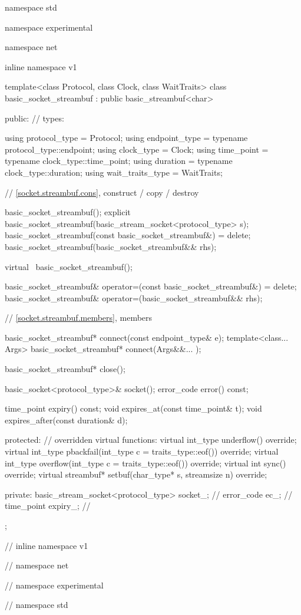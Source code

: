 \begin{codeblock}
namespace std {
namespace experimental {
namespace net {
inline namespace v1 {

  template<class Protocol, class Clock, class WaitTraits>
  class basic_socket_streambuf : public basic_streambuf<char>
  {
  public:
    // types:

    using protocol_type = Protocol;
    using endpoint_type = typename protocol_type::endpoint;
    using clock_type = Clock;
    using time_point = typename clock_type::time_point;
    using duration = typename clock_type::duration;
    using wait_traits_type = WaitTraits;

    // \ref{socket.streambuf.cons}, construct / copy / destroy

    basic_socket_streambuf();
    explicit basic_socket_streambuf(basic_stream_socket<protocol_type> s);
    basic_socket_streambuf(const basic_socket_streambuf&) = delete;
    basic_socket_streambuf(basic_socket_streambuf&& rhs);

    virtual ~basic_socket_streambuf();

    basic_socket_streambuf& operator=(const basic_socket_streambuf&) = delete;
    basic_socket_streambuf& operator=(basic_socket_streambuf&& rhs);

    // \ref{socket.streambuf.members}, members

    basic_socket_streambuf* connect(const endpoint_type& e);
    template<class... Args> basic_socket_streambuf* connect(Args&&... );

    basic_socket_streambuf* close();

    basic_socket<protocol_type>& socket();
    error_code error() const;

    time_point expiry() const;
    void expires_at(const time_point& t);
    void expires_after(const duration& d);

  protected:
    // overridden virtual functions:
    virtual int_type underflow() override;
    virtual int_type pbackfail(int_type c = traits_type::eof()) override;
    virtual int_type overflow(int_type c = traits_type::eof()) override;
    virtual int sync() override;
    virtual streambuf* setbuf(char_type* s, streamsize n) override;

  private:
    basic_stream_socket<protocol_type> socket_; // \expos
    error_code ec_; // \expos
    time_point expiry_; // \expos
  };

} // inline namespace v1
} // namespace net
} // namespace experimental
} // namespace std
\end{codeblock}

